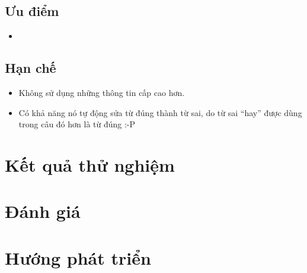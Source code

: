 \documentclass[a4paper,oneside,14pt]{extbook} %
\begin{document}
\subsection{Ưu điểm}

\begin{itemize}
\item 
\end{itemize}

\subsection{Hạn chế}
\begin{itemize}
\item Không sử dụng những thông tin cấp cao hơn.
\item Có khả năng nó tự động sửa từ đúng thành từ sai, do từ sai
  ``hay'' được dùng trong câu đó hơn là từ đúng :-P
\end{itemize}

\section{Kết quả thử nghiệm}


\section{Đánh giá}


\section{Hướng phát triển}
\label{sec:todo}


\end{document}
